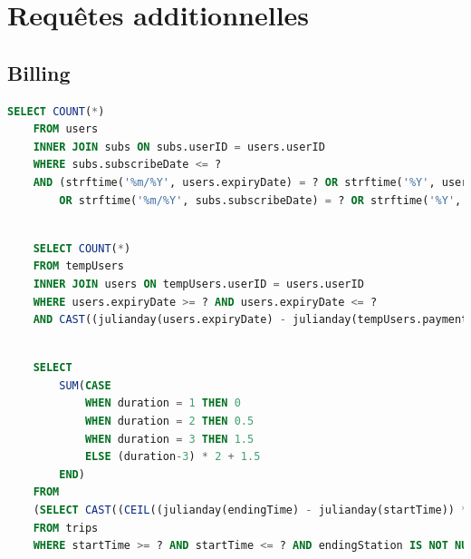 \documentclass[a4paper,11pt]{report}
\begin{document}
\chapter{Requ\^etes additionnelles}

    \section{Billing}
    \begin{lstlisting}[language=sql]
    SELECT COUNT(*) 
    FROM users
    INNER JOIN subs ON subs.userID = users.userID
    WHERE subs.subscribeDate <= ?
    AND (strftime('%m/%Y', users.expiryDate) = ? OR strftime('%Y', users.expiryDate) = ?) 
        OR strftime('%m/%Y', subs.subscribeDate) = ? OR strftime('%Y', subs.subscribeDate) = ?
    \end{lstlisting}

    \begin{lstlisting}[language=sql]

    SELECT COUNT(*)
    FROM tempUsers
    INNER JOIN users ON tempUsers.userID = users.userID
    WHERE users.expiryDate >= ? AND users.expiryDate <= ?
    AND CAST((julianday(users.expiryDate) - julianday(tempUsers.paymentDate)) AS INTEGER) == ?
    \end{lstlisting}

    \begin{lstlisting}[language=sql]

    SELECT
        SUM(CASE 
            WHEN duration = 1 THEN 0 
            WHEN duration = 2 THEN 0.5 
            WHEN duration = 3 THEN 1.5 
            ELSE (duration-3) * 2 + 1.5 
        END)
    FROM 
    (SELECT CAST((CEIL((julianday(endingTime) - julianday(startTime)) * 48.0)) AS INTEGER) AS duration
    FROM trips
    WHERE startTime >= ? AND startTime <= ? AND endingStation IS NOT NULL AND endingTime IS NOT NULL)
    \end{lstlisting}
\end{document}
